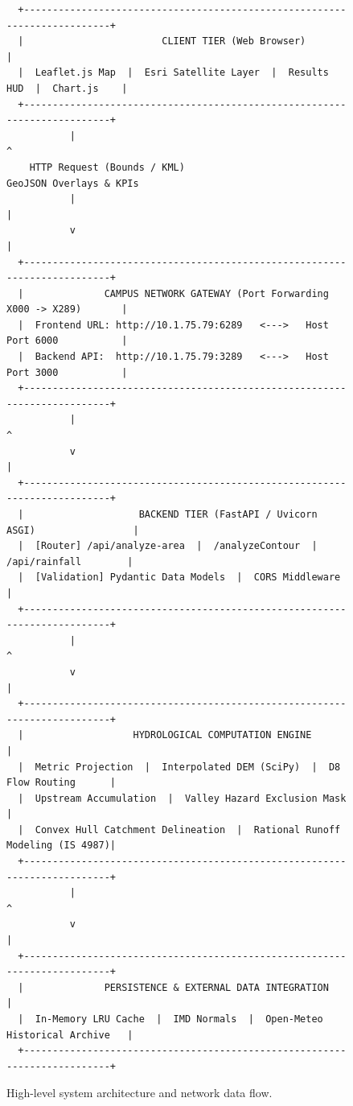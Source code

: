 \documentclass[manuscript,screen,nonacm]{acmart}
\begin{document}
\begin{figure}[h]
  \centering
  \begin{verbatim}
  +--------------------------------------------------------------------------+
  |                        CLIENT TIER (Web Browser)                         |
  |  Leaflet.js Map  |  Esri Satellite Layer  |  Results HUD  |  Chart.js    |
  +--------------------------------------------------------------------------+
           |                                                      ^
    HTTP Request (Bounds / KML)                        GeoJSON Overlays & KPIs
           |                                                      |
           v                                                      |
  +--------------------------------------------------------------------------+
  |              CAMPUS NETWORK GATEWAY (Port Forwarding X000 -> X289)       |
  |  Frontend URL: http://10.1.75.79:6289   <--->   Host Port 6000           |
  |  Backend API:  http://10.1.75.79:3289   <--->   Host Port 3000           |
  +--------------------------------------------------------------------------+
           |                                                      ^
           v                                                      |
  +--------------------------------------------------------------------------+
  |                    BACKEND TIER (FastAPI / Uvicorn ASGI)                 |
  |  [Router] /api/analyze-area  |  /analyzeContour  |  /api/rainfall        |
  |  [Validation] Pydantic Data Models  |  CORS Middleware                   |
  +--------------------------------------------------------------------------+
           |                                                      ^
           v                                                      |
  +--------------------------------------------------------------------------+
  |                   HYDROLOGICAL COMPUTATION ENGINE                        |
  |  Metric Projection  |  Interpolated DEM (SciPy)  |  D8 Flow Routing      |
  |  Upstream Accumulation  |  Valley Hazard Exclusion Mask                  |
  |  Convex Hull Catchment Delineation  |  Rational Runoff Modeling (IS 4987)|
  +--------------------------------------------------------------------------+
           |                                                      ^
           v                                                      |
  +--------------------------------------------------------------------------+
  |              PERSISTENCE & EXTERNAL DATA INTEGRATION                     |
  |  In-Memory LRU Cache  |  IMD Normals  |  Open-Meteo Historical Archive   |
  +--------------------------------------------------------------------------+
  \end{verbatim}
  \caption{High-level system architecture and network data flow.}
  \label{fig:architecture}
\end{figure}
\end{document}
